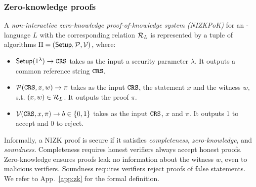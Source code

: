


\subsubsection{Zero-knowledge proofs}
\label{def: NIZK}
A {\em non-interactive zero-knowledge proof-of-knowledge system (NIZKPoK)} for an \NP-language $L$ with the corresponding relation $\mathcal{R}_{L}$ is represented by a tuple of algorithms $\Pi = (\mathsf{Setup}, \mathcal{P}, \mathcal{V})$, where:
    \begin{itemize}[itemsep=0em,nosep]
        \item $\mathsf{Setup}( 1^{\lambda}) \rightarrow \mathtt{CRS}$ takes as the input a security parameter $\lambda$. It outputs a common reference string $\mathtt{CRS}$.
        \item $\mathcal{P}(\mathtt{CRS}, x, w) \rightarrow \pi$ takes as the input $\mathtt{CRS}$, the statement $x$ and the witness $w$, s.t. $(x, w) \in \mathcal{R}_{L}$. It outputs the proof $\pi$.
        \item $\mathcal{V}(\mathtt{CRS}, x, \pi) \rightarrow b \in \{0,1\}$ takes as the input $\mathtt{CRS}$, $x$ and $\pi$. It outputs 1 to accept and 0 to reject.
    \end{itemize}

Informally, a NIZK proof is secure if it satisfies \emph{completeness}, \emph{zero-knowledge}, and \emph{soundness}. Completeness requires honest verifiers always accept honest proofs. Zero-knowledge ensures proofs leak no information about the witness $w$, even to malicious verifiers. Soundness requires verifiers reject proofs of false statements.
We refer to App.~\ref{app:zk} for the formal definition.


